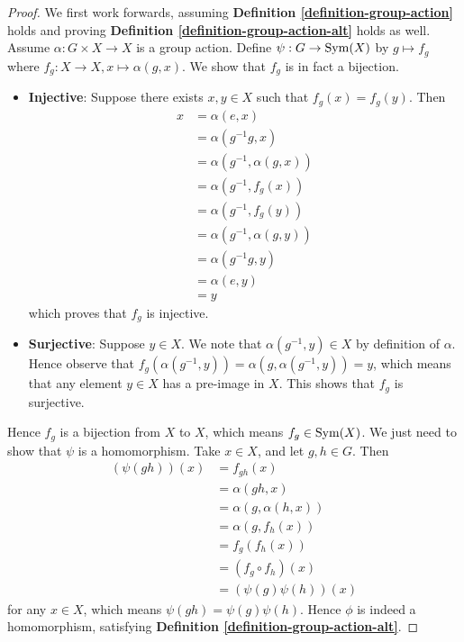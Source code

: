 \begin{proof}
    We first work forwards, assuming \textbf{Definition \ref{definition-group-action}} holds and proving \textbf{Definition \ref{definition-group-action-alt}} holds as well. Assume $\alpha: G \times X \to X$ is a group action. Define $\psi: G \to \mathrm{Sym}(X)$ by $g \mapsto f_g$ where $f_g: X \to X, x \mapsto \alpha(g, x)$. We show that $f_g$ is in fact a bijection.
    
    \newpage
    
    \begin{itemize}
        \item \textbf{Injective}: Suppose there exists $x, y \in X$ such that $f_g(x) = f_g(y)$. Then
        \begin{align*}
            x &= \alpha(e, x)\\
            &= \alpha(g^{-1}g, x)\\
            &= \alpha(g^{-1}, \alpha(g, x))\\
            &= \alpha(g^{-1}, f_g(x))\\
            &= \alpha(g^{-1}, f_g(y))\\
            &= \alpha(g^{-1}, \alpha(g, y))\\
            &= \alpha(g^{-1}g, y)\\
            &= \alpha(e, y)\\
            &= y
        \end{align*}
        which proves that $f_g$ is injective.
        \item \textbf{Surjective}: Suppose $y \in X$. We note that $\alpha(g^{-1}, y) \in X$ by definition of $\alpha$. Hence observe that $f_g(\alpha(g^{-1}, y)) = \alpha(g, \alpha(g^{-1}, y)) = y$, which means that any element $y \in X$ has a pre-image in $X$. This shows that $f_g$ is surjective.
    \end{itemize}
    Hence $f_g$ is a bijection from $X$ to $X$, which means $f_g \in \mathrm{Sym}(X)$. We just need to show that $\psi$ is a homomorphism. Take $x \in X$, and let $g, h \in G$. Then
    \begin{align*}
        (\psi(gh))(x) &= f_{gh}(x)\\
        &= \alpha(gh, x)\\
        &= \alpha(g, \alpha(h, x))\\
        &= \alpha(g, f_h(x))\\
        &= f_g(f_h(x))\\
        &= (f_g \circ f_h)(x)\\
        &= (\psi(g)\psi(h))(x)
    \end{align*}
    for any $x \in X$, which means $\psi(gh) = \psi(g)\psi(h)$. Hence $\phi$ is indeed a homomorphism, satisfying \textbf{Definition \ref{definition-group-action-alt}}.


\end{proof}
